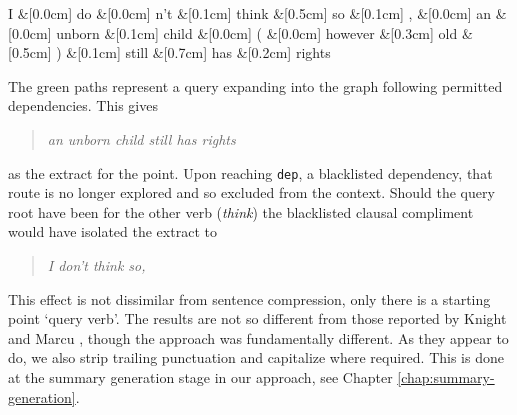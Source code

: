     \begin{center}
      \begin{dependency}[edge horizontal padding=0]
        \begin{deptext}
          I \&[0.0cm] do \&[0.0cm] n't \&[0.1cm] think \&[0.5cm] so \&[0.1cm] , \&[0.0cm] an \&[0.0cm] unborn \&[0.1cm] child \&[0.0cm] ( \&[0.0cm] however \&[0.3cm] old \&[0.5cm] ) \&[0.1cm] still \&[0.7cm] has \&[0.2cm] rights \\
        \end{deptext}





      \end{dependency}
    \end{center}

    The green paths represent a query expanding into the graph following permitted dependencies. This gives \blockquote{\textit{an unborn child still has rights}} as the extract for the point. Upon reaching \texttt{dep}, a blacklisted dependency, that route is no longer explored and so excluded from the context. Should the query root have been for the other verb (\textit{think}) the blacklisted clausal compliment would have isolated the extract to \blockquote{\textit{I don't think so,}}.

    This effect is not dissimilar from sentence compression, only there is a starting point `query verb'. The results are not so different from those reported by Knight and Marcu \cite{knight2000statistics}, though the approach was fundamentally different. As they appear to do, we also strip trailing punctuation and capitalize where required. This is done at the summary generation stage in our approach, see Chapter \ref{chap:summary-generation}.

